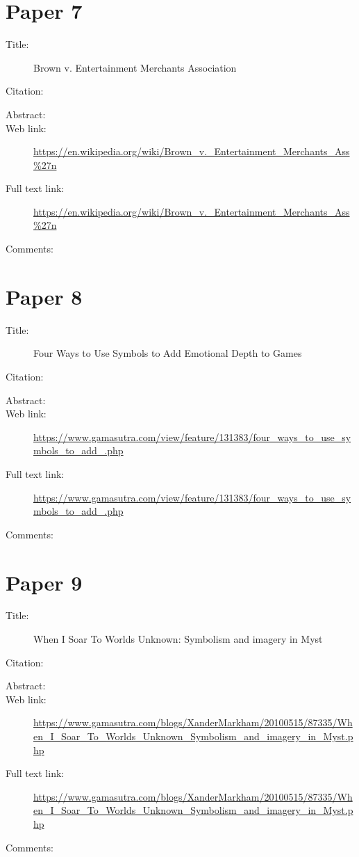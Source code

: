 \documentclass{scrartcl}
\begin{document}
\section*{Paper 7}
\begin{description}
\item[Title:] Brown v. Entertainment Merchants Association
\item[Citation:] \cite{brownv}
\item[Abstract:]
\item[Web link:]\url {https://en.wikipedia.org/wiki/Brown_v._Entertainment_Merchants_Ass%27n}
\item[Full text link:] \url {https://en.wikipedia.org/wiki/Brown_v._Entertainment_Merchants_Ass%27n}
\item[Comments:]
\end{description}

\section*{Paper 8}
\begin{description}
\item[Title:] Four Ways to Use Symbols to Add Emotional Depth to Games
\item[Citation:] \cite{Depth}
\item[Abstract:]
\item[Web link:] \url {https://www.gamasutra.com/view/feature/131383/four_ways_to_use_symbols_to_add_.php}
\item[Full text link:]\url {https://www.gamasutra.com/view/feature/131383/four_ways_to_use_symbols_to_add_.php}
\item[Comments:] 
\end{description}

\section*{Paper 9}
\begin{description}
\item[Title:] When I Soar To Worlds Unknown: Symbolism and imagery in Myst
\item[Citation:] \cite{xander}
\item[Abstract:]
\item[Web link:]\url {https://www.gamasutra.com/blogs/XanderMarkham/20100515/87335/When_I_Soar_To_Worlds_Unknown_Symbolism_and_imagery_in_Myst.php}
\item[Full text link:]\url {https://www.gamasutra.com/blogs/XanderMarkham/20100515/87335/When_I_Soar_To_Worlds_Unknown_Symbolism_and_imagery_in_Myst.php}
\item[Comments:] 
\end{description}
\end{document}
